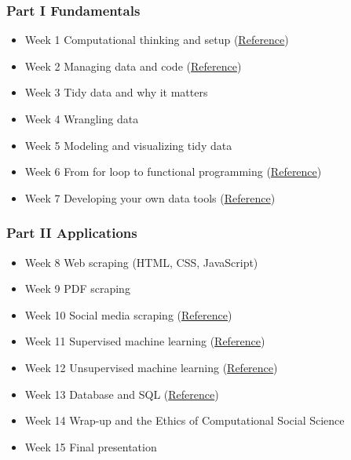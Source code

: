 \documentclass[
]{article}
\providecommand{\tightlist}{%
  \setlength{\itemsep}{0pt}\setlength{\parskip}{0pt}}
\begin{document}
\hypertarget{part-i-fundamentals-1}{%
\subsubsection{Part I Fundamentals}\label{part-i-fundamentals-1}}

\begin{itemize}
\tightlist
\item
  Week 1 Computational thinking and setup
  (\href{https://jaeyk.github.io/PS239T/motivation.html}{Reference})
\item
  Week 2 Managing data and code
  (\href{https://jaeyk.github.io/PS239T/git-bash.html}{Reference})
\item
  Week 3 Tidy data and why it matters
\item
  Week 4 Wrangling data
\item
  Week 5 Modeling and visualizing tidy data
\item
  Week 6 From for loop to functional programming
  (\href{https://jaeyk.github.io/PS239T/functional-programming.html}{Reference})
\item
  Week 7 Developing your own data tools
  (\href{https://jaeyk.github.io/PS239T/functional-programming.html\#developing-your-own-data-products}{Reference})
\end{itemize}

\hypertarget{part-ii-applications-1}{%
\subsubsection{Part II Applications}\label{part-ii-applications-1}}

\begin{itemize}
\tightlist
\item
  Week 8 Web scraping (HTML, CSS, JavaScript)
\item
  Week 9 PDF scraping
\item
  Week 10 Social media scraping
  (\href{https://jaeyk.github.io/PS239T/semi-structured-data.html\#xmljson-government-databasesocial-media-scraping}{Reference})
\item
  Week 11 Supervised machine learning
  (\href{https://jaeyk.github.io/PS239T/machine-learning.html\#supervised-learning}{Reference})
\item
  Week 12 Unsupervised machine learning
  (\href{https://jaeyk.github.io/PS239T/machine-learning.html\#unsupervised-learning}{Reference})
\item
  Week 13 Database and SQL
  (\href{https://jaeyk.github.io/PS239T/git-bash.html}{Reference})
\item
  Week 14 Wrap-up and the Ethics of Computational Social Science
\item
  Week 15 Final presentation
\end{itemize}
\end{document}
